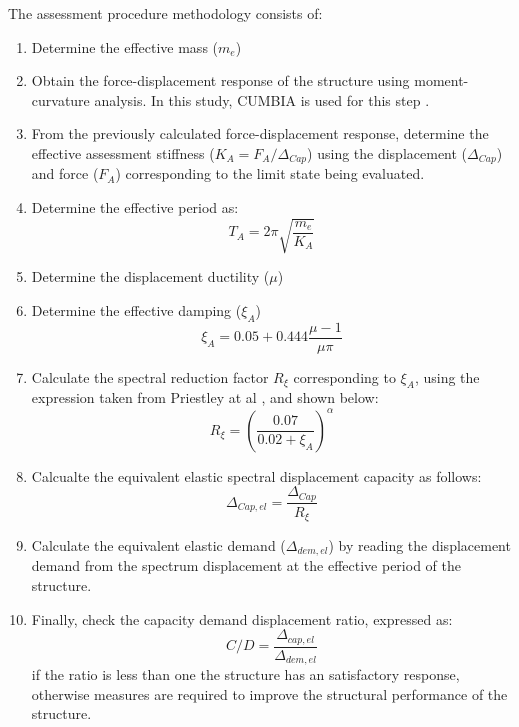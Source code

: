 The assessment procedure methodology consists of:
\begin{enumerate}
    \item Determine the effective mass ($m_{e}$)
    \item Obtain the force-displacement response of the structure using moment-curvature analysis. In this study, CUMBIA is used for this step \cite{Montejo2007}.
    \item From the previously calculated force-displacement response, determine the effective assessment stiffness ($K_{A}=F_{A}/\Delta_{Cap}$) using the displacement ($\Delta_{Cap}$) and force ($F_{A}$) corresponding to the limit state being evaluated.
    \item Determine the effective period as:
    \begin{equation}
        T_{A}=2\pi \sqrt{\frac{m_{e}}{K_{A}}}
    \end{equation}
    \item Determine the displacement ductility ($\mu$)
    \item Determine the effective damping ($\xi_{A}$)
    \begin{equation}
        \xi_{A}=0.05+0.444\frac{\mu-1}{\mu\pi}
    \end{equation}
    \item Calculate the spectral reduction factor $R_{\xi}$ corresponding to $\xi_{A}$, using the expression taken from Priestley at al \cites{Priestley2007}, and shown below:
    \begin{equation}
        R_{\xi}=\left(\frac{0.07}{0.02+\xi_{A}}\right)^{\alpha}
    \end{equation}
    \item Calcualte the equivalent elastic spectral displacement capacity as follows:
    \begin{equation}
        \Delta_{Cap,el}=\frac{\Delta_{Cap}}{R_{\xi}}
    \end{equation}
    \item Calculate the equivalent elastic demand ($\Delta_{dem,el}$) by reading the displacement demand from the spectrum displacement at the effective period of the structure. 
    \item Finally, check the capacity demand displacement ratio, expressed as: 
    \begin{equation}
        C/D= \frac{\Delta_{cap,el}}{\Delta_{dem,el}}
    \end{equation}
    if the ratio is less than one the structure has an satisfactory response, otherwise measures are required to improve the structural performance of the structure.
\end{enumerate}

